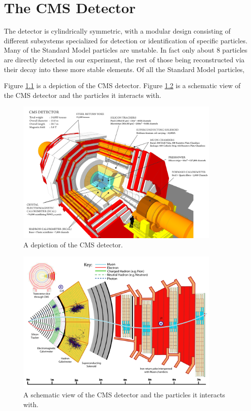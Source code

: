 \chapter{The CMS Detector}
\label{chap:detector}

The detector is cylindrically symmetric, with a modular design consisting of different subsystems specialized for detection or identification of specific particles. Many of the Standard Model particles are unstable. In fact only about 8 particles are directly detected in our experiment, the rest of those being reconstructed via their decay into these more stable elements. Of all the Standard Model particles, 

Figure \ref{fig:howcmsworks} is a depiction of the CMS detector. Figure \ref{fig:schematicview} is a schematic view of the CMS detector and the particles it interacts with.

\begin{figure}[htbp]
\centering
\includegraphics[width=0.9\textwidth]{figs/howcmsworks.png}
\caption{A depiction of the CMS detector.}
\label{fig:howcmsworks}
\end{figure}

\begin{figure}[htbp]
\centering
\includegraphics[width=0.9\textwidth]{figs/CMS-PRF-14-001_Figure_001.pdf}
\caption{A schematic view of the CMS detector and the particles it interacts with.}
\label{fig:schematicview}
\end{figure}

